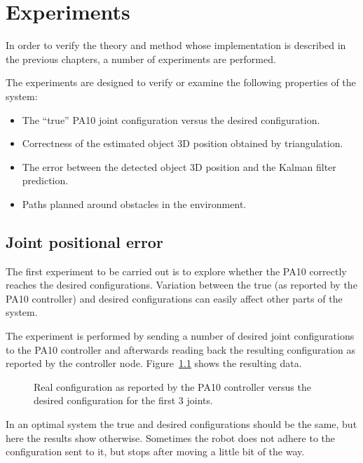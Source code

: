 \chapter{Experiments}
\label{cha:experiments}
In order to verify the theory and method whose implementation is described in the previous chapters, a number of experiments are performed.

The experiments are designed to verify or examine the following properties of the system:
\begin{itemize}
    \item The ``true'' PA10 joint configuration versus the desired configuration.
    \item Correctness of the estimated object 3D position obtained by triangulation. %
    \item The error between the detected object 3D position and the Kalman filter prediction.
    \item Paths planned around obstacles in the environment.
\end{itemize}


\section{Joint positional error}
The first experiment to be carried out is to explore whether the PA10 correctly reaches the desired configurations.
Variation between the true (as reported by the PA10 controller) and desired configurations can easily affect other parts of the system.

The experiment is performed by sending a number of desired joint configurations to the PA10 controller and afterwards reading back the resulting configuration as reported by the controller node. Figure~\ref{fig:q_real_desired} shows the resulting data.

\begin{figure}[htb]
    \centering
    \resizebox{.8\columnwidth}{!}{%
        
    }
    \caption{Real configuration as reported by the PA10 controller versus the desired configuration for the first 3 joints.}
    \label{fig:q_real_desired}
\end{figure}


In an optimal system the true and desired configurations should be the same, but here the results show otherwise.
Sometimes the robot does not adhere to the configuration sent to it, but stops after moving a little bit of the way.

